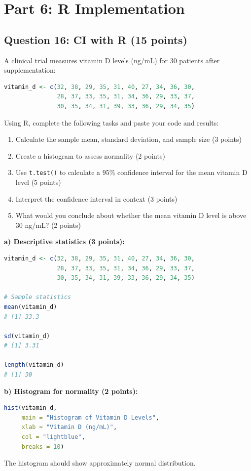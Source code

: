 \documentclass[11pt]{article}
\begin{document}
\section*{Part 6: R Implementation}

\subsection*{Question 16: CI with R (15 points)}

A clinical trial measures vitamin D levels (ng/mL) for 30 patients after supplementation:

\begin{lstlisting}[language=R, basicstyle=\small\ttfamily]
vitamin_d <- c(32, 38, 29, 35, 31, 40, 27, 34, 36, 30,
               28, 37, 33, 35, 31, 34, 36, 29, 33, 37,
               30, 35, 34, 31, 39, 33, 36, 29, 34, 35)
\end{lstlisting}

Using R, complete the following tasks and paste your code and results:
\begin{enumerate}[label=\alph*)]
\item Calculate the sample mean, standard deviation, and sample size (3 points)
\item Create a histogram to assess normality (2 points)
\item Use \texttt{t.test()} to calculate a 95\% confidence interval for the mean vitamin D level (5 points)
\item Interpret the confidence interval in context (3 points)
\item What would you conclude about whether the mean vitamin D level is above 30 ng/mL? (2 points)
\end{enumerate}

\textbf{a) Descriptive statistics (3 points):}
\begin{lstlisting}[language=R, basicstyle=\small\ttfamily]
vitamin_d <- c(32, 38, 29, 35, 31, 40, 27, 34, 36, 30,
               28, 37, 33, 35, 31, 34, 36, 29, 33, 37,
               30, 35, 34, 31, 39, 33, 36, 29, 34, 35)

# Sample statistics
mean(vitamin_d)
# [1] 33.3

sd(vitamin_d)
# [1] 3.31

length(vitamin_d)
# [1] 30
\end{lstlisting}

\textbf{b) Histogram for normality (2 points):}
\begin{lstlisting}[language=R, basicstyle=\small\ttfamily]
hist(vitamin_d,
     main = "Histogram of Vitamin D Levels",
     xlab = "Vitamin D (ng/mL)",
     col = "lightblue",
     breaks = 10)
\end{lstlisting}
The histogram should show approximately normal distribution.
\end{document}
